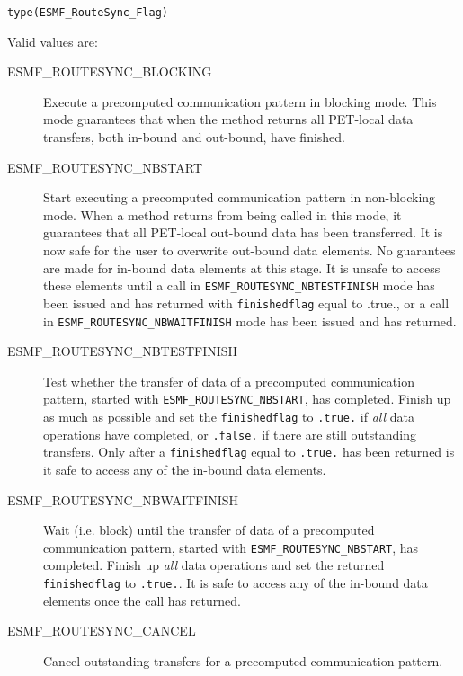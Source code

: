 {\tt type(ESMF\_RouteSync\_Flag)}

Valid values are:
\begin{description}

\item [ESMF\_ROUTESYNC\_BLOCKING]
         Execute a precomputed communication pattern in blocking mode. This
         mode guarantees that when the method returns all PET-local data
         transfers, both in-bound and out-bound, have finished. 
\item [ESMF\_ROUTESYNC\_NBSTART]
         \begin{sloppypar}
         Start executing a precomputed communication pattern in non-blocking
         mode. When a method returns from being called in this mode, it
         guarantees that all PET-local out-bound data has been transferred.
         It is now safe for the user to overwrite out-bound data elements.
         No guarantees are made for in-bound data elements at this stage. It is
         unsafe to access these elements until a call in
         {\tt ESMF\_ROUTESYNC\_NBTESTFINISH} mode has been issued and has returned
         with {\tt finishedflag} equal to .true., or a call in
         {\tt ESMF\_ROUTESYNC\_NBWAITFINISH} mode has been issued and has returned.
         \end{sloppypar}
\item [ESMF\_ROUTESYNC\_NBTESTFINISH]
         Test whether the transfer of data of a precomputed communication
         pattern, started with {\tt ESMF\_ROUTESYNC\_NBSTART}, has completed.
         Finish up as much as possible and set the {\tt finishedflag} to 
         {\tt .true.} if {\em all} data operations have completed, or
         {\tt .false.} if there are still outstanding transfers. Only after
         a {\tt finishedflag} equal to {\tt .true.} has been returned is it
         safe to access any of the in-bound data elements.
\item [ESMF\_ROUTESYNC\_NBWAITFINISH]
         Wait (i.e. block) until the transfer of data of a precomputed
         communication pattern, started with {\tt ESMF\_ROUTESYNC\_NBSTART}, has
         completed. Finish up {\em all} data operations and set the returned 
         {\tt finishedflag} to {\tt .true.}. It is safe to access any of the
         in-bound data elements once the call has returned.
\item [ESMF\_ROUTESYNC\_CANCEL]
         Cancel outstanding transfers for a precomputed communication pattern.
\end{description}

